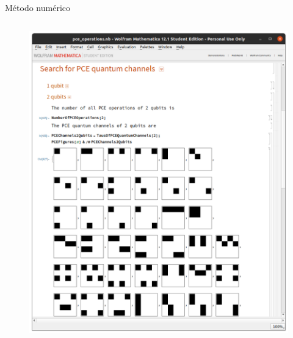 \documentclass[xcolor=dvipsnames,presentation]{beamer}%
\begin{document}
\begin{frame}[t]{Método numérico}
{\begin{columns}
\begin{column}{0.5\textwidth}
\begin{figure}
		\includegraphics[width=1\textwidth]{numerico_02}
	\end{figure}		
		\end{column}
	\end{columns}		
	}
	
\end{frame}
\end{document}
